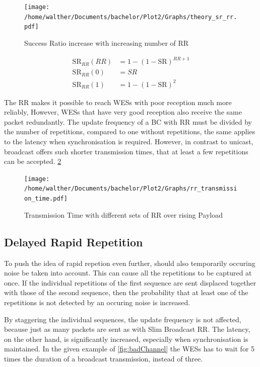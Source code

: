 \begin{figure}[h]
	\centering
	\texttt{[image: /home/walther/Documents/bachelor/Plot2/Graphs/theory\_sr\_rr.pdf]}
	\caption{Success Ratio increase with increasing number of RR}
	\label{fig:theory_rr_sc}
\end{figure}

\begin{align}
	\label{math:rr_sr}
	\text{SR}_{RR}(RR)	&= 1-(1-\text{SR})^{RR+1} \\
	\text{SR}_{RR}(0) 	&= SR \\
	\text{SR}_{RR}(1) 	&= 1-(1-\text{SR})^{2}
\end{align}

The RR makes it possible to reach WESs with poor reception much more reliably,
However, WESs that have very good reception also receive the same packet redundantly.
The update frequency of a BC with RR must be divided by the number of repetitions, compared to one without repetitions,
the same applies to the latency when synchronisation is required.
However, in contrast to unicast, broadcast offers such shorter transmission times,
that at least a few repetitions can be accepted. \cref{fig:rr_analytic}

\begin{figure}[h]
	\centering
	\texttt{[image: /home/walther/Documents/bachelor/Plot2/Graphs/rr\_transmission\_time.pdf]}
	\caption{Transmission Time with different sets of RR over rising Payload}
	\label{fig:rr_analytic}
\end{figure}

\subsection*{Delayed Rapid Repetition}
\label{sub:DelayedRepetition}

To push the idea of rapid repetion even further, should also temporarily occuring noise be taken into account.
This can cause all the repetitions to be captured at once.
If the individual repetitions of the first sequence are sent displaced together with those of the second sequence,
then the probability that at least one of the repetitions is not detected by an occuring noise is increased.

By staggering the individual sequences, the update frequency is not affected,
because just as many packets are sent as with Slim Broadcast RR.
The latency, on the other hand, is significantly increased, especially when synchronisation is maintained.
In the given example of \cref{fig:badChannel} the WESs has to wait for 5 times the duration of a broadcast transmission, instead of three.

